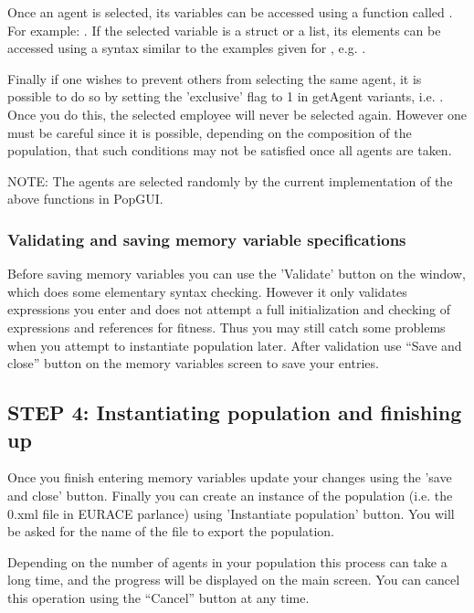 \documentclass[10pt]{article}
\begin{document}
Once an agent is selected, its variables can be accessed using a function called . For example:
  . If the selected variable is a struct or a list, its elements can be accessed using a syntax similar to the examples given for , e.g. .

Finally if one wishes to prevent others from selecting the same agent, it is possible to do so by setting the 'exclusive' flag to 1 in getAgent variants, i.e. . Once you do this, the selected employee will never be selected again. However one must be careful since it is possible, depending on the composition of the population, that such conditions may not be satisfied once all agents are taken.

NOTE: The agents are selected randomly by the current implementation of the above functions in PopGUI.

\subsubsection{Validating and saving memory variable specifications}
Before saving memory variables you can use the 'Validate' button on the window, which does some elementary syntax checking. However it only validates expressions you enter and does not attempt a full initialization and checking of expressions and references for fitness. Thus you may still catch some problems when you attempt to instantiate population later. After validation use ``Save and close'' button on the memory variables screen to save your entries.

\subsection{STEP 4: Instantiating population and finishing up}
Once you finish entering memory variables update your changes using the 'save and close' button. Finally you can create an instance of the population (i.e. the 0.xml file in EURACE parlance) using 'Instantiate population' button. You will be asked for the name of the file to export the population. 

Depending on the number of agents in your population this process can take a long time, and the progress will be displayed on the main screen. You can cancel this operation using the ``Cancel'' button at any time.
\end{document}
